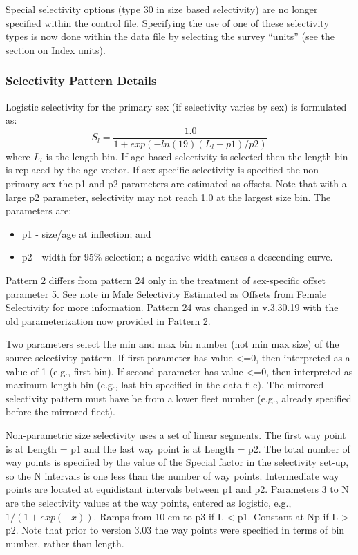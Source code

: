 Special selectivity options (type 30 in size based selectivity) are no longer specified within the control file. Specifying the use of one of these selectivity types is now done within the data file by selecting the survey ``units'' (see the section on \hyperlink{IndexUnits}{Index units}).

\subsubsection{Selectivity Pattern Details}
Logistic selectivity for the primary sex (if selectivity varies by sex) is formulated as:
	\begin{equation}
	S_l = \frac{1.0}{1+exp(-ln(19)(L_l - p1)/p2)}
	\end{equation}
where $L_l$ is the length bin. If age based selectivity is selected then the length bin is replaced by the age vector. If sex specific selectivity is specified the non-primary sex the p1 and p2 parameters are estimated as offsets. Note that with a large p2 parameter, selectivity may not reach 1.0 at the largest size bin. The parameters are:
\begin{itemize}
	\item p1 - size/age at inflection; and
	\item p2 - width for 95\% selection; a negative width causes a descending curve.
\end{itemize}

Pattern 2 differs from pattern 24 only in the treatment of sex-specific offset parameter 5. See note in \hyperlink{MaleSelectivityOffset}{Male Selectivity Estimated as Offsets from Female Selectivity} for more information. Pattern 24 was changed in v.3.30.19 with the old parameterization now provided in Pattern 2.

Two parameters select the min and max bin number (not min max size) of the source selectivity pattern. If first parameter has value <=0, then interpreted as a value of 1 (e.g., first bin). If second parameter has value <=0, then interpreted as maximum length bin (e.g., last bin specified in the data file). The mirrored selectivity pattern must have be from a lower fleet number (e.g., already specified before the mirrored fleet).


Non-parametric size selectivity uses a set of linear segments. The first way point is at Length = p1 and the last way point is at Length = p2. The total number of way points is specified by the value of the Special factor in the selectivity set-up, so the N intervals is one less than the number of way points. Intermediate way points are located at equidistant intervals between p1 and p2. Parameters 3 to N are the selectivity values at the way points, entered as logistic, e.g., $1/(1+exp(-x))$. Ramps from 10 cm to p3 if L < p1. Constant at Np if L > p2. Note that prior to version 3.03 the way points were specified in terms of bin number, rather than length.


